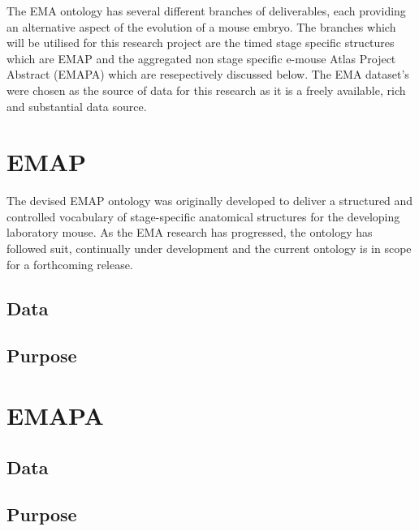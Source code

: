 The EMA ontology has several different branches of deliverables, each providing an alternative aspect of the evolution of a mouse embryo. The branches which will be utilised for this research project are the timed stage specific structures which are EMAP and the aggregated non stage specific e-mouse Atlas Project Abstract (EMAPA) which are resepectively discussed below. The EMA dataset's were chosen as the source of data for this research as it is a freely available, rich and substantial data source.

\section{EMAP}
The devised EMAP ontology was originally developed to deliver a structured and controlled vocabulary of stage-specific anatomical structures for the developing laboratory mouse. As the EMA research has progressed, the ontology has followed suit, continually under development and the current ontology is in scope for a forthcoming release.
\subsection{Data}
\subsection{Purpose}
\section{EMAPA}
\subsection{Data}
\subsection{Purpose}
